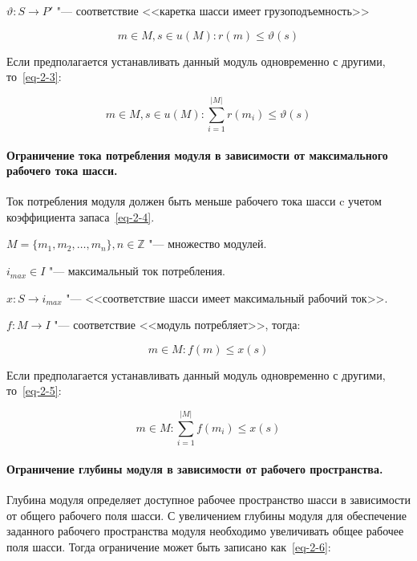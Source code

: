 \noindent $\vartheta: S \rightarrow P'$ "--- соответствие <<каретка шасси имеет грузоподъемность>> 

\begin{equation}
m \in M, s \in u(M): r(m) \leq \vartheta(s)
\label{eq-2-2}
\end{equation}

Если предполагается устанавливать данный модуль одновременно с другими, то~\cref{eq-2-3}:

\begin{equation}
m \in M, s \in u(M): \sum_{i=1}^{|M|}r(m_i) \leq \vartheta(s)
\label{eq-2-3}
\end{equation}

\paragraph{Ограничение тока потребления модуля в зависимости от максимального рабочего тока шасси.} Ток потребления модуля должен быть меньше рабочего тока шасси c учетом коэффициента запаса~\cref{eq-2-4}.

\noindent $M = \{m_1, m_2, \ldots, m_n\}, n \in \mathbb{Z} $ "--- множество модулей.

\noindent $i_{max} \in I$ "--- максимальный ток потребления.

\noindent $x: S \rightarrow i_{max}$ "--- <<соответствие шасси имеет максимальный рабочий ток>>.

\noindent $f: M \rightarrow I$ "--- соответствие <<модуль потребляет>>, тогда:

\begin{equation}
m \in M: f(m) \leq x(s)
\label{eq-2-4}
\end{equation}

Если предполагается устанавливать данный модуль одновременно с другими, то~\cref{eq-2-5}:

\begin{equation}
m \in M: \sum_{i=1}^{|M|}f(m_i) \leq x(s)
\label{eq-2-5}
\end{equation}

\paragraph{Ограничение глубины модуля в зависимости от рабочего пространства.} Глубина модуля определяет доступное рабочее пространство шасси в зависимости от общего рабочего поля шасси. С увеличением глубины модуля для обеспечение заданного рабочего пространства модуля необходимо увеличивать общее рабочее поля шасси. Тогда ограничение может быть записано как~\cref{eq-2-6}:

